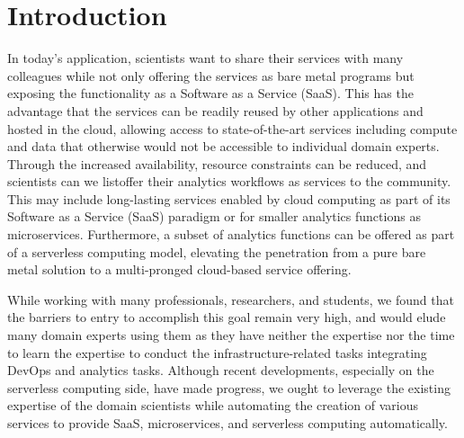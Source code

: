 
\newcommand{\Cloudmesh}{%
$\blacksquare\hspace{-0.1cm}
\blacksquare\hspace{-0.1cm}
\blacksquare\hspace{-0.1cm}
\blacksquare\hspace{-0.1cm}
\blacksquare\hspace{-0.1cm}
\blacksquare\hspace{-0.1cm}
\blacksquare\hspace{-0.1cm}
\blacksquare\hspace{-0.1cm}
\blacksquare\hspace{-0.1cm}
$ ~}

\newcommand{\COMMENT}[1]{}
\newcommand{\CENSOR}[2]{#2~}

\newcommand{\BLOCKCENSOR}[2]{

\bigskip
\fbox{
\begin{minipage}{0.8\columnwidth}
{\bf\em #1
}
\end{minipage}
}}


\section{Introduction}

In today's application, scientists want to share their services with
many colleagues while not only offering the services as bare metal
programs but exposing the functionality as a Software as a Service
(SaaS). This has the advantage that the services can be readily reused
by other applications and hosted in the cloud, allowing access to
state-of-the-art services including compute and data that otherwise would
not be accessible to individual domain experts. Through the increased
availability, resource constraints can be reduced, and scientists can
we listoffer their analytics workflows as services to the community. This may
include long-lasting services enabled by cloud computing as part of
its Software as a Service (SaaS) paradigm or for smaller analytics
functions as microservices. Furthermore, a subset of analytics
functions can be offered as part of a serverless computing model,
elevating the penetration from a pure bare metal solution to a
multi-pronged cloud-based service offering.

While working with many professionals, researchers, and students, we
found that the barriers to entry to accomplish this goal remain very
high, and would elude many domain experts using them as they have neither the
expertise nor the time to learn the expertise to conduct the
infrastructure-related tasks integrating DevOps and analytics
tasks. Although recent developments, especially on the serverless
computing side, have made progress, we ought to leverage the existing
expertise of the domain scientists while automating the creation of
various services to provide SaaS, microservices, and serverless
computing automatically.

